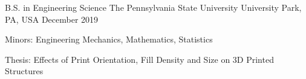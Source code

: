 
\vspace{-.5em}
\begin{cventries}
	
	\cventry
	{B.S. in Engineering Science} %
	{The Pennsylvania State University} %
	{University Park, PA, USA} %
	{December 2019} %
	{
		\begin{cvitems} %
			\item {Minors: Engineering Mechanics, Mathematics, Statistics}
			\item {Thesis: Effects of Print Orientation, Fill Density and Size on 3D Printed Structures}
		\end{cvitems}
	}
	
\end{cventries}